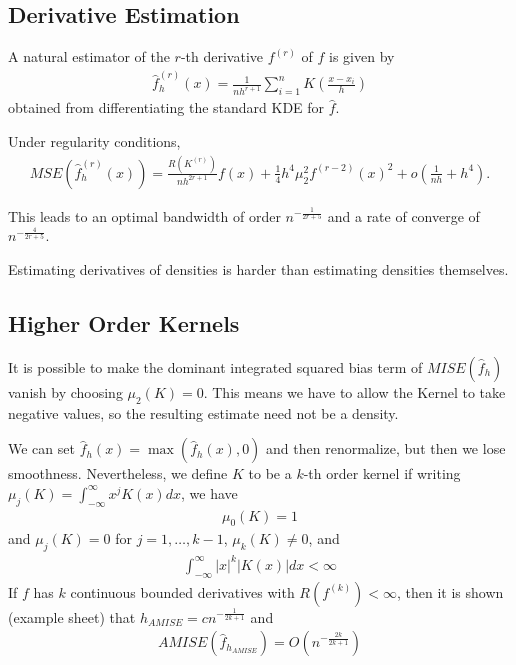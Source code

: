 \subsection{Derivative Estimation}
\label{sec:deriv-estim-1}


A natural estimator of the $r$-th derivative $f^{(r)}$ of $f$ is given
by
\begin{align}
  \label{eq:33}
  \hat f^{(r)}_{h}(x) = \frac{1}{n h^{r+1}} \sum_{i=1}^{n} K(\frac{x -
  x_{i}}{h})
\end{align}
obtained from differentiating the standard KDE for $\hat f$.

Under regularity conditions,
\begin{align}
  \label{eq:39}
  MSE(\hat f^{(r)}_{h}(x)) = \frac{R(K^{(r)})}{nh^{2r+1}}f(x) +
  \frac{1}{4} h^{4} \mu_{2}^{2} f^{(r-2)}(x)^{2} + o(\frac{1}{nh} + h^{4}).
\end{align}

This leads to an optimal bandwidth of order $n^{-\frac{1}{2r + 5}}$
and a rate of converge of $n^{-\frac{4}{2r+5}}$.

\begin{boxthm}
  Estimating derivatives of densities is harder than estimating
  densities themselves.
\end{boxthm}

\subsection{Higher Order Kernels}
\label{sec:higher-order-kernels}

It is possible to make the dominant integrated squared bias term of
$MISE(\hat f_{h})$ vanish by choosing $\mu_{2}(K) = 0$.  This means
we have to allow the Kernel to take negative values, so the resulting
estimate need not be a density.

We can set $\hat f_{h}(x) = \max (\hat f_{h}(x), 0)$ and then
renormalize, but then we lose smoothness.  Nevertheless, we define $K$
to be a $k$-th order kernel if writing $\mu_{j}(K) =
\int_{-\infty}^{\infty} x^{j} K(x) dx$, we have
\begin{align}
  \label{eq:42}
  \mu_{0}(K) = 1
\end{align} and $\mu_{j}(K) = 0$ for $j = 1, \dots, k - 1$,
$\mu_{k}(K) \neq 0$, and
\begin{align}
  \label{eq:43}
  \int_{-\infty}^{\infty} |x|^{k} |K(x)| dx < \infty
\end{align} If $f$ has $k$ continuous bounded derivatives with
$R(f^{(k)}) < \infty$, then it is shown (example sheet) that
$h_{AMISE} = c n^{-\frac{1}{2k+1}}$ and
\begin{align}
  \label{eq:44}
  AMISE(\hat f_{h_{AMISE}}) = O(n^{-\frac{2k}{2k+1}})
\end{align}


